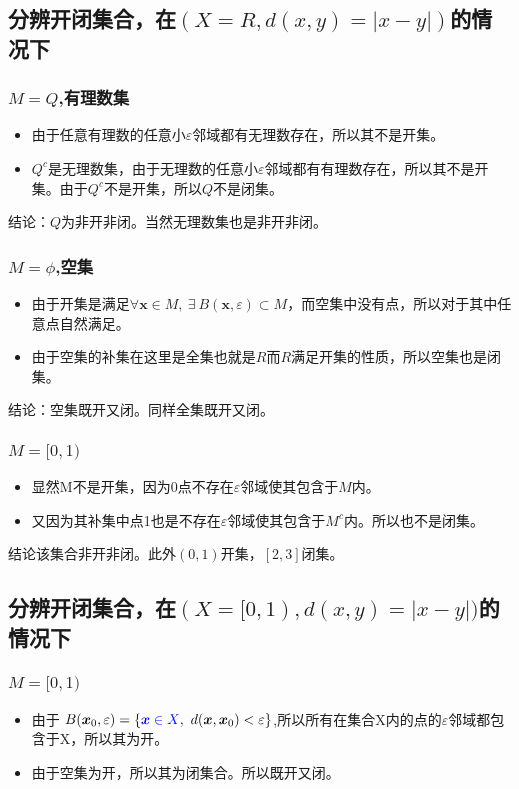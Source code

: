 \documentclass[11pt]{article}
\begin{document}
\begin{CJK*}{UTF8}{gbsn}
\subsection{分辨开闭集合，在$(X=R,d(x,y)=|x-y|)$的情况下}
\subsubsection{$M=Q$,有理数集}
\begin{itemize}
	\item 由于任意有理数的任意小$\varepsilon$邻域都有无理数存在，所以其不是开集。
	\item $Q^c$是无理数集，由于无理数的任意小$\varepsilon$邻域都有有理数存在，所以其不是开集。由于$Q^c$不是开集，所以$Q$不是闭集。
\end{itemize}
结论：$Q$为非开非闭。当然无理数集也是非开非闭。
\subsubsection{$M=\phi$,空集}
\begin{itemize}
	\item 由于开集是满足$\forall \bm x \in M,~\exists~ B(\bm x,\varepsilon )\subset M $，而空集中没有点，所以对于其中任意点自然满足。
	\item 由于空集的补集在这里是全集也就是$R$而$R$满足开集的性质，所以空集也是闭集。
\end{itemize}
结论：空集既开又闭。同样全集既开又闭。
\subsubsection{$M=[0,1)$}
\begin{itemize}
	\item 显然M不是开集，因为0点不存在$\varepsilon$邻域使其包含于$M$内。
	\item 又因为其补集中点1也是不存在$\varepsilon$邻域使其包含于$M^c$内。所以也不是闭集。
\end{itemize}
结论该集合非开非闭。此外$(0,1)$开集，$[2,3]$闭集。
\subsection{分辨开闭集合，在$(X=[0,1),d(x,y)=|x-y|)$的情况下}
\subsubsection{$M=[0,1)$}
\begin{itemize}
	\item 由于	$B(\bm x_0,\varepsilon )=\{\textcolor{blue}{\bm x \in X},~d(\bm x,\bm x_0)<\varepsilon \}$,所以所有在集合X内的点的$\varepsilon$邻域都包含于X，所以其为开。
	\item 由于空集为开，所以其为闭集合。所以既开又闭。
\end{itemize}

\end{CJK*}
\end{document}
